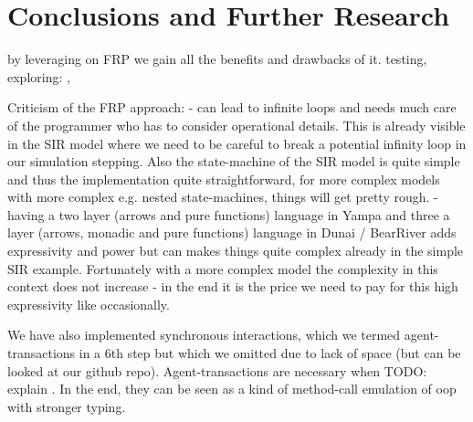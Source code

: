 \section{Conclusions and Further Research}
by leveraging on FRP we gain all the benefits and drawbacks of it.
testing, exploring: \cite{perez_testing_2017}, \cite{perez_back_2017}

Criticism of the FRP approach:
- can lead to infinite loops and needs much care of the programmer who has to consider operational details. This is already visible in the SIR model where we need to be careful to break a potential infinity loop in our simulation stepping. Also the state-machine of the SIR model is quite simple and thus the implementation quite straightforward, for more complex models with more complex e.g. nested state-machines, things will get pretty rough.
- having a two layer (arrows and pure functions) language in Yampa \cite{jeffrey_causality_2013} and three a layer (arrows, monadic and pure functions) language in Dunai / BearRiver adds expressivity and power but can makes things quite complex already in the simple SIR example. Fortunately with a more complex model the complexity in this context does not increase - in the end it is the price we need to pay for this high expressivity like occasionally.

We have also implemented synchronous interactions, which we termed agent-transactions in a 6th step but which we omitted due to lack of space (but can be looked at our github repo). Agent-transactions are necessary when TODO: explain . In the end, they can be seen as a kind of method-call emulation of oop with stronger typing.

